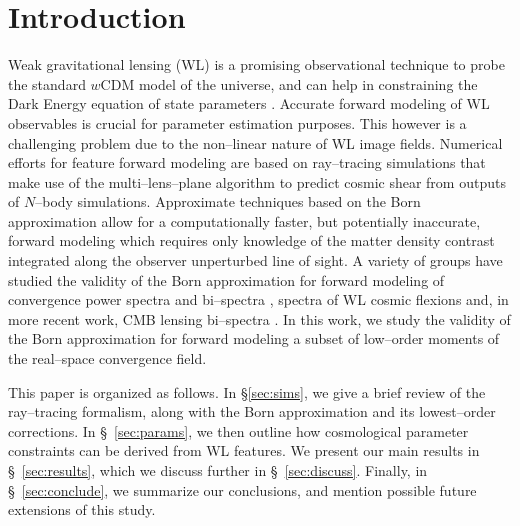 \documentclass[reprint,aps,prd,superscriptaddress,showkeys,showpacs]{revtex4-1}
\begin{document}

\maketitle



\section{Introduction}
%
Weak gravitational lensing (WL) is a promising observational technique to probe the standard $w$CDM model of the universe, and can help in constraining the Dark Energy equation of state parameters \citep{wlreview}. Accurate forward modeling of WL observables is crucial for parameter estimation purposes. This however is a challenging problem due to the non--linear nature of WL image fields. Numerical efforts for feature forward modeling are based on ray--tracing simulations that make use of the multi--lens--plane algorithm \citep{RayTracingJain,RayTracingHartlap} to predict cosmic shear from outputs of $N$--body simulations. Approximate techniques based on the Born approximation allow for a computationally faster, but potentially inaccurate, forward modeling \citep{RayTracingHartlap} which requires only knowledge of the matter density contrast integrated along the observer unperturbed line of sight. A variety of groups have studied the validity of the Born approximation for forward modeling of convergence power spectra \citep{HirataKrause} and bi--spectra \citep{WLBispectrumDodelson}, spectra of WL cosmic flexions \citep{BornFlexion} and, in more recent work, CMB lensing bi--spectra \citep{CMBPrattenLewis}. In this work, we study the validity of the Born approximation for forward modeling a subset of low--order moments of the real--space convergence field. 

This paper is organized as follows.  In \S\ref{sec:sims}, we give a brief review of the ray--tracing formalism, along with the Born approximation and its lowest--order corrections. In \S~\ref{sec:params}, we then outline how cosmological parameter constraints can be derived from WL features. We present our main results in \S~\ref{sec:results}, which we discuss further in \S~\ref{sec:discuss}.  Finally, in \S~\ref{sec:conclude}, we summarize our conclusions, and mention possible future extensions of this study.       
\end{document}
